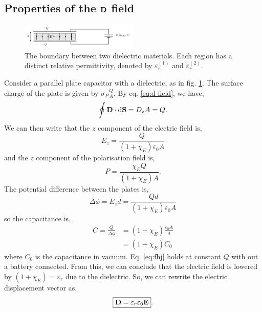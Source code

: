 \documentclass{book}
\begin{document}
\subsection{Properties of the $\vb{D}$ field}
\begin{figure}
	\centering
	\includegraphics[width=0.5\textwidth]{dielecetric capacitor.png}
	\caption{The boundary between two dielectric materials. Each region has a distinct relative permittivity, denoted by $\varepsilon^{(1)}_r$ and $\varepsilon^{(2)}_r$.}
	\label{fig:dielectric capacitor}
\end{figure}
Consider a parallel plate capacitor with a dielectric, as in fig. \ref{fig:dielectric capacitor}. The surface charge of the plate is given by $\sigma_P \frac{Q}{A}$. By eq. \eqref{eq:d field}, we have,
\begin{equation}
	\oint \vb{D}\cdot{\dd{\vb{S}}} = D_z A = Q.
\end{equation}
We can then write that the $z$ component of the electric field is,
\begin{equation}
	E_z = \frac{Q}{(1 + \chi_E)\varepsilon_0 A}
\end{equation}
and the $z$ component of the polarisation field is,
\begin{equation}
	P = \frac{\chi_E Q}{(1 + \chi_E)A}.
\end{equation}
The potential difference between the plates is,
\begin{equation}
	\Delta \phi = E_z d = \frac{Qd}{(1 + \chi_E)\varepsilon_0A}
\end{equation}
so the capacitance is,
\begin{equation}
	\begin{split}
		C = \frac{Q}{\Delta \phi} & = (1 + \chi_E)\frac{\varepsilon_0A}{d}\\
		& = (1 + \chi_E)C_0
	\end{split} \label{eq:fhj}
\end{equation}
where $C_0$ is the capacitance in vacuum. Eq. \eqref{eq:fhj} holds at constant $Q$ with out a battery connected. From this, we can conclude that the electric field is lowered by $(1 + \chi_E) = \varepsilon_r$ due to the dielectric. So, we can rewrite the electric displacement vector as,
\begin{equation}
	\boxed{\vb{D} = \varepsilon_r\varepsilon_0\vb{E}}. \label{eq:d form}
\end{equation}
\end{document}
